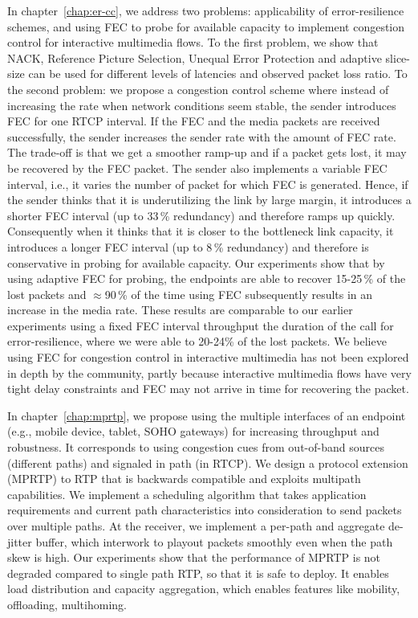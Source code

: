In chapter~\ref{chap:er-cc}, we address two problems: applicability of
error-resilience schemes, and using FEC to probe for available capacity to
implement congestion control for interactive multimedia flows. To the first
problem, we show that NACK, Reference Picture Selection, Unequal Error
Protection and adaptive slice-size can be used for different levels of
latencies and observed packet loss ratio. To the second problem: we propose a
congestion control scheme where instead of increasing the rate when network
conditions seem stable, the sender introduces FEC for one RTCP interval. If
the FEC and the media packets are received successfully, the sender increases
the sender rate with the amount of FEC rate. The trade-off is that we get a
smoother ramp-up and if a packet gets lost, it may be recovered by the FEC
packet. The sender also implements a variable FEC interval, i.e., it varies
the number of packet for which FEC is generated. Hence, if the sender thinks
that it is underutilizing the link by large margin, it introduces a shorter
FEC interval (up to 33\,\% redundancy) and therefore ramps up quickly.
Consequently when it thinks that it is closer to the bottleneck link capacity,
it introduces a longer FEC interval (up to 8\,\% redundancy) and therefore is
conservative in probing for available capacity. Our experiments show that by
using adaptive FEC for probing, the endpoints are able to recover 15-25\,\% of
the lost packets and $\approx$90\,\% of the time using FEC subsequently
results in an increase in the media rate. These results are comparable to our
earlier experiments using a fixed FEC interval throughput the duration of the
call for error-resilience, where we were able to 20-24\;\% of the lost
packets. We believe using FEC for congestion control in interactive multimedia
has not been explored in depth by the community, partly because interactive
multimedia flows have very tight delay constraints and FEC may not arrive in
time for recovering the packet.

In chapter~\ref{chap:mprtp}, we propose using the multiple interfaces of an
endpoint (e.g., mobile device, tablet, SOHO gateways) for increasing
throughput and robustness. It corresponds to using congestion cues from
out-of-band sources (different paths) and signaled in path (in RTCP). We
design a protocol extension (MPRTP) to RTP that is backwards compatible and
exploits multipath capabilities. We implement a scheduling algorithm that
takes application requirements and current path characteristics into
consideration to send packets over multiple paths. At the receiver, we
implement a per-path and aggregate de-jitter buffer, which interwork to
playout packets smoothly even when the path skew is high. Our experiments show
that the performance of MPRTP is not degraded compared to single path RTP, so
that it is safe to deploy. It enables load distribution and capacity
aggregation, which enables features like mobility, offloading, multihoming.

